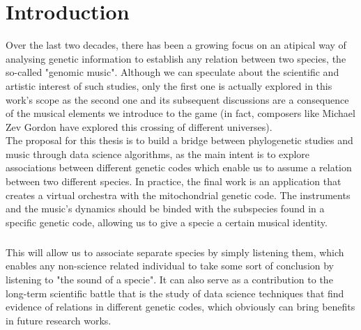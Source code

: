 \documentclass[11pt,twoside,a4paper]{report}
\begin{document}
\chapter{Introduction}
Over the last two decades, there has been a growing focus on an atipical way of analysing genetic information to establish any relation between two species, the so-called "genomic music". Although we can speculate about the scientific and artistic interest of such studies, only the first one is actually explored in this work's scope as the second one and its subsequent discussions are a consequence of the musical elements we introduce to the game (in fact, composers like Michael Zev Gordon \cite{guardian} have explored this crossing of different universes). \\
The proposal for this thesis is to build a bridge between phylogenetic studies and music through data science algorithms, as the main intent is to explore associations between different genetic codes which enable us to assume a relation between two different species. In practice, the final work is an application that creates a virtual orchestra with the mitochondrial genetic code. The instruments and the music's dynamics should be binded with the subspecies found in a specific genetic code, allowing us to give a specie a certain musical identity.\\
\paragraph{}This will allow us to associate separate species by simply listening them, which enables any non-science related individual to take some sort of conclusion by listening to "the sound of a specie". It can also serve as a contribution to the long-term scientific battle that is the study of data science techniques that find evidence of relations in different genetic codes, which obviously can bring benefits in future research works.
\end{document}
